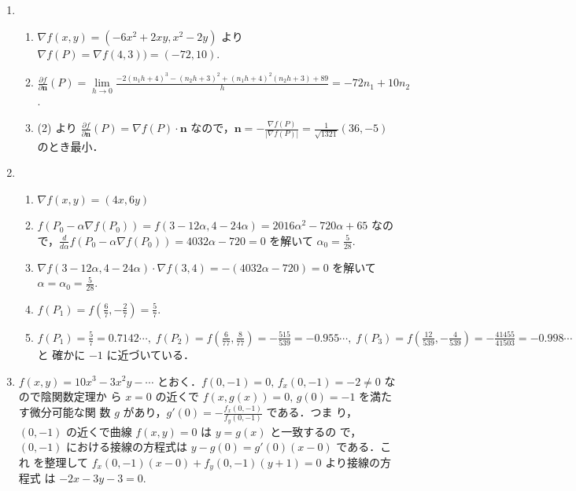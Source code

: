 \documentclass[11pt, uplatex, dvipdfmx, twoside]{jsarticle}
\renewcommand{\dlim}{\lim\limits} %
\begin{document}
\begin{enumerate}[label=\ref{sec:partial}.\arabic*]
  \setlength{\itemsep}{1ex}
  
\item
  \begin{enumerate}[label=(\arabic*)]
    \setlength{\itemsep}{1ex}
    
  \item $\nabla f(x,y) = \left( -6x^2+2xy, x^2-2y\right)$ より
    $\nabla f(P) = \nabla f(4,3))=(-72,10)$.

  \item
    $\frac{\partial f}{\partial \bm{n}}(P)= \dlim_{h \to
      0}\frac{-2(n_1 h + 4)^3 - (n_2 h+3)^2 +
      (n_1h+4)^2(n_2h+3)+89}{h} = -72 n_1 + 10 n_2$.

    
  \item (2) より
    $\frac{\partial f}{\partial \bm{n}}(P) = \nabla f(P) \cdot \bm{n}$
    なので，$\bm{n} = -\frac{\nabla f(P)}{ |\nabla f(P)|} =
    \frac{1}{\sqrt{1321}}(36,-5)$ のとき最小．
  \end{enumerate}

\newpage
  
 \item
   \begin{enumerate}[label=(\arabic*)]
     \setlength{\itemsep}{1ex}
     
   \item $\nabla f(x,y) = (4x, 6y)$

   \item
     $f(P_0 - \alpha \nabla f(P_0))=f(3-12\alpha, 4-24\alpha) =
     2016\alpha^2-720\alpha+65$
     なので，$\frac{d}{d\alpha} f(P_0 - \alpha \nabla f(P_0)) =
     4032\alpha-720=0$ を解いて $\alpha_0=\frac{5}{28}$.

   \item
     $\nabla f(3-12\alpha, 4-24\alpha) \cdot \nabla f(3,4) =
     -(4032\alpha-720) =0$ を解いて $\alpha = \alpha_0=\frac{5}{28}$.

   \item $f(P_1) = f\left(\frac{6}{7}, -\frac{2}{7} \right) = \frac{5}{7}$.

   \item
     $ f(P_1) = \frac{5}{7}=0.7142\cdots , \;  f(P_2) = f\left( \frac{6}{77}, \frac{8}{77}\right) =
     -\frac{515}{539}=-0.955\cdots, \; f(P_3) = f\left(\frac{12}{539},
       -\frac{4}{539}\right) = -\frac{41455}{41503} = -0.998\cdots$ と
     確かに $-1$ に近づいている．
   \end{enumerate}

 \item $f(x,y) = 10x^3-3x^2y-\cdots$
   とおく．$f(0,-1) = 0, \, f_x(0,-1) = -2 \neq 0$ なので陰関数定理か
   ら $x=0$ の近くで $f(x, g(x))=0,\, g(0)=-1$ を満たす微分可能な関
   数 $g$ があり，$g'(0) = -\frac{f_x(0,-1)}{f_y(0,-1)}$ である．つま
   り，$(0,-1)$ の近くで曲線 $f(x,y)=0$ は $y=g(x)$ と一致するの
   で，$(0,-1)$ における接線の方程式は $y-g(0)=g'(0)(x-0)$ である．これ
   を整理して $f_x(0,-1)(x-0) + f_y(0,-1)(y+1) =0$ より接線の方程式
   は $-2x-3y-3=0$.


\end{enumerate}
\end{document}
